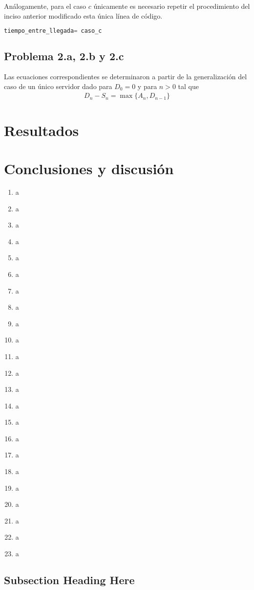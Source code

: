 \documentclass[journal]{IEEEtran}
\begin{document}
Análogamente, para el caso $c$ únicamente es necesario repetir el procedimiento del inciso anterior modificado esta única línea de código. 
\begin{lstlisting}[language=Python, caption=Caso c]
	tiempo_entre_llegada= caso_c 
\end{lstlisting}


\subsection{Problema 2.a, 2.b y 2.c }

Las ecuaciones correspondientes se determinaron a partir de la generalización del caso de un único servidor dado para $D_0=0$ y para $n>0$ tal que 
\begin{align}
	D_n-S_n=\max\{A_n,D_{n-1}\}
\end{align}

\section{Resultados}
\section{Conclusiones y discusión}

\begin{enumerate}
	\item a
	\item a
	\item a\item a\item a\item a\item a\item a\item a\item a\item a\item a\item a\item a\item a\item a\item a\item a\item a\item a\item a\item a\item a
\end{enumerate}
\subsection{Subsection Heading Here}
\end{document}

